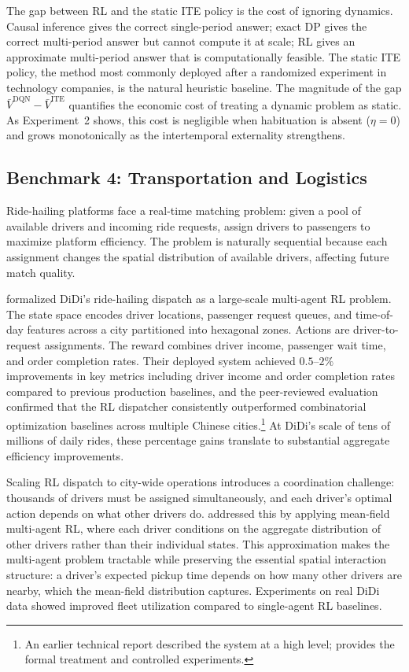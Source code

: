 

The gap between RL and the static ITE policy is the cost of ignoring dynamics. Causal inference gives the correct single-period answer; exact DP gives the correct multi-period answer but cannot compute it at scale; RL gives an approximate multi-period answer that is computationally feasible. The static ITE policy, the method most commonly deployed after a randomized experiment in technology companies, is the natural heuristic baseline. The magnitude of the gap $\bar{V}^{\mathrm{DQN}} - \bar{V}^{\mathrm{ITE}}$ quantifies the economic cost of treating a dynamic problem as static. As Experiment~2 shows, this cost is negligible when habituation is absent ($\eta = 0$) and grows monotonically as the intertemporal externality strengthens.


\subsection{Benchmark 4: Transportation and Logistics}
\label{sec:benchmark_dispatch}

Ride-hailing platforms face a real-time matching problem: given a pool of available drivers and incoming ride requests, assign drivers to passengers to maximize platform efficiency. The problem is naturally sequential because each assignment changes the spatial distribution of available drivers, affecting future match quality.

\citet{Qin2021dispatch} formalized DiDi's ride-hailing dispatch as a large-scale multi-agent RL problem. The state space encodes driver locations, passenger request queues, and time-of-day features across a city partitioned into hexagonal zones. Actions are driver-to-request assignments. The reward combines driver income, passenger wait time, and order completion rates. Their deployed system achieved $0.5$--$2\%$ improvements in key metrics including driver income and order completion rates compared to previous production baselines, and the peer-reviewed evaluation confirmed that the RL dispatcher consistently outperformed combinatorial optimization baselines across multiple Chinese cities.\footnote{An earlier technical report \citep{DiDi2019} described the system at a high level; \citet{Qin2021dispatch} provides the formal treatment and controlled experiments.} At DiDi's scale of tens of millions of daily rides, these percentage gains translate to substantial aggregate efficiency improvements.

Scaling RL dispatch to city-wide operations introduces a coordination challenge: thousands of drivers must be assigned simultaneously, and each driver's optimal action depends on what other drivers do. \citet{Li2019ridesharing} addressed this by applying mean-field multi-agent RL, where each driver conditions on the aggregate distribution of other drivers rather than their individual states. This approximation makes the multi-agent problem tractable while preserving the essential spatial interaction structure: a driver's expected pickup time depends on how many other drivers are nearby, which the mean-field distribution captures. Experiments on real DiDi data showed improved fleet utilization compared to single-agent RL baselines.

